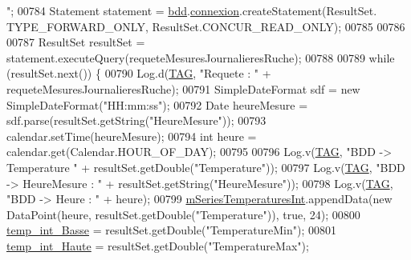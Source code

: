 \begin{DoxyCode}
{      "};
00784                         Statement statement = \hyperlink{classfr_1_1campus_1_1laurainc_1_1honeybee_1_1_ruche_a0eb43a2b63fb83e9d5af6cd6b754c7da}{bdd}.\hyperlink{classfr_1_1campus_1_1laurainc_1_1honeybee_1_1_base_de_donnees_a358899633f17b8cd00dd2c4cfdd40abe}{connexion}.createStatement(ResultSet.
      TYPE\_FORWARD\_ONLY, ResultSet.CONCUR\_READ\_ONLY);
00785 
00786 
00787                         ResultSet resultSet = statement.executeQuery(requeteMesuresJournalieresRuche);
00788 
00789                         \textcolor{keywordflow}{while} (resultSet.next()) \{
00790                             Log.d(\hyperlink{classfr_1_1campus_1_1laurainc_1_1honeybee_1_1_ruche_a44739cbb0fa7451c1edc240a3f51c257}{TAG}, \textcolor{stringliteral}{"Requete : "} + requeteMesuresJournalieresRuche);
00791                             SimpleDateFormat sdf = \textcolor{keyword}{new} SimpleDateFormat(\textcolor{stringliteral}{"HH:mm:ss"});
00792                             Date heureMesure = sdf.parse(resultSet.getString(\textcolor{stringliteral}{"HeureMesure"}));
00793                             calendar.setTime(heureMesure);
00794                             \textcolor{keywordtype}{int} heure = calendar.get(Calendar.HOUR\_OF\_DAY);
00795 
00796                             Log.v(\hyperlink{classfr_1_1campus_1_1laurainc_1_1honeybee_1_1_ruche_a44739cbb0fa7451c1edc240a3f51c257}{TAG}, \textcolor{stringliteral}{"BDD -> Temperature "} + resultSet.getDouble(\textcolor{stringliteral}{"Temperature"}));
00797                             Log.v(\hyperlink{classfr_1_1campus_1_1laurainc_1_1honeybee_1_1_ruche_a44739cbb0fa7451c1edc240a3f51c257}{TAG}, \textcolor{stringliteral}{"BDD -> HeureMesure : "} + resultSet.getString(\textcolor{stringliteral}{"HeureMesure"}));
00798                             Log.v(\hyperlink{classfr_1_1campus_1_1laurainc_1_1honeybee_1_1_ruche_a44739cbb0fa7451c1edc240a3f51c257}{TAG}, \textcolor{stringliteral}{"BDD -> Heure : "} + heure);
00799                             \hyperlink{classfr_1_1campus_1_1laurainc_1_1honeybee_1_1_ruche_a0fe6febbc698e5c0ed34783a9cbb7719}{mSeriesTemperaturesInt}.appendData(\textcolor{keyword}{new} DataPoint(heure, 
      resultSet.getDouble(\textcolor{stringliteral}{"Temperature"})), \textcolor{keyword}{true}, 24);
00800                             \hyperlink{classfr_1_1campus_1_1laurainc_1_1honeybee_1_1_ruche_a09b3b4f5f23736064df7d6dd245d1210}{temp\_int\_Basse} = resultSet.getDouble(\textcolor{stringliteral}{"TemperatureMin"});
00801                             \hyperlink{classfr_1_1campus_1_1laurainc_1_1honeybee_1_1_ruche_af50a9a4e5305bd1cd439e5071ed31c9c}{temp\_int\_Haute} = resultSet.getDouble(\textcolor{stringliteral}{"TemperatureMax"});

\end{DoxyCode}
